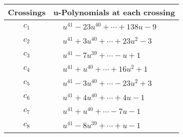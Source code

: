 \documentclass[1p]{elsarticle_modified}
\theoremstyle{definition}
\begin{document}
\begin{tabular}{m{50pt}|m{274pt}}
Crossings & \hspace{64pt}u-Polynomials at each crossing \\
\hline $$\begin{aligned}c_{1}\end{aligned}$$&$\begin{aligned}
&u^{41}-23 u^{40}+\cdots+138 u-9
\end{aligned}$\\
\hline $$\begin{aligned}c_{2}\end{aligned}$$&$\begin{aligned}
&u^{41}+3 u^{40}+\cdots+23 u^2-3
\end{aligned}$\\
\hline $$\begin{aligned}c_{3}\end{aligned}$$&$\begin{aligned}
&u^{41}-7 u^{39}+\cdots- u+1
\end{aligned}$\\
\hline $$\begin{aligned}c_{4}\end{aligned}$$&$\begin{aligned}
&u^{41}+u^{40}+\cdots+16 u^2+1
\end{aligned}$\\
\hline $$\begin{aligned}c_{5}\end{aligned}$$&$\begin{aligned}
&u^{41}-3 u^{40}+\cdots-23 u^2+3
\end{aligned}$\\
\hline $$\begin{aligned}c_{6}\end{aligned}$$&$\begin{aligned}
&u^{41}+4 u^{40}+\cdots+4 u-1
\end{aligned}$\\
\hline $$\begin{aligned}c_{7}\end{aligned}$$&$\begin{aligned}
&u^{41}+u^{40}+\cdots-7 u-1
\end{aligned}$\\
\hline $$\begin{aligned}c_{8}\end{aligned}$$&$\begin{aligned}
&u^{41}-8 u^{39}+\cdots+u-1
\end{aligned}$\\

\end{tabular}
\end{document}
